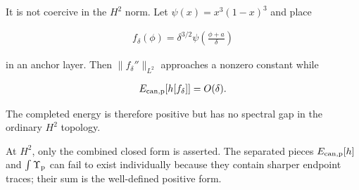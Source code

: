 It is not coercive in the $H^2$ norm. Let $\psi(x)=x^3(1-x)^3$ and place

\begin{align}
f_\delta(\phi)
=\delta^{3/2}\psi\left(\frac{\phi+a}{\delta}\right)
\end{align}

in an anchor layer. Then $\|f_\delta''\|_{L^2}$ approaches a nonzero constant while

\begin{align}
E_{{\rm can,p}}[h[f_\delta]]=O(\delta).
\end{align}

The completed energy is therefore positive but has no spectral gap in the ordinary $H^2$ topology.

At $H^2$, only the combined closed form is asserted. The separated pieces $E_{{\rm can,p}}[h]$ and $\int\Upsilon_{\rm p}$ can fail to exist individually because they contain sharper endpoint traces; their sum is the well-defined positive form.

